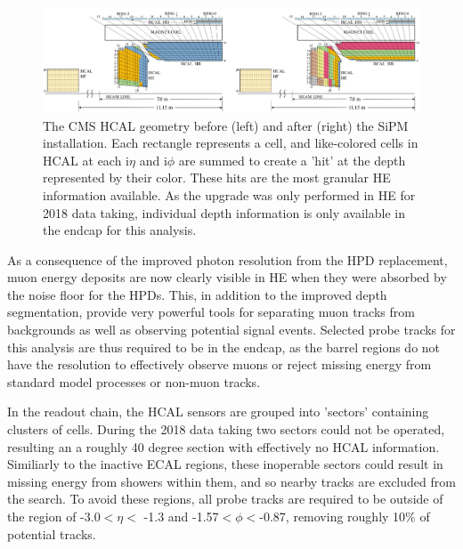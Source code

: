 \begin{figure}[!htpb]
	   \centering
	      \includegraphics[width=\textwidth]{figures/HE_upgrade.jpg}
		 \caption[The 2018 HE upgrade]{The CMS HCAL geometry before (left) and after (right) the SiPM installation. Each rectangle represents a cell, and like-colored cells in HCAL at each i$\eta$ and i$\phi$ are summed to create a 'hit' at the depth represented by their color. These hits are the most granular HE information available. As the upgrade was only performed in HE for 2018 data taking, individual depth information is only available in the endcap for this analysis.}
	    \label{fig:HElayout}
\end{figure}

As a consequence of the improved photon resolution from the HPD replacement, muon energy deposits are now clearly visible in HE when they were absorbed by the noise floor for the HPDs. 
This, in addition to the improved depth segmentation, provide very powerful tools for separating muon tracks from backgrounds as well as observing potential signal events.
Selected probe tracks for this analysis are thus required to be in the endcap, as the barrel regions do not have the resolution to effectively observe muons or reject missing energy from standard model processes or non-muon tracks.

In the readout chain, the HCAL sensors are grouped into 'sectors' containing clusters of cells. During the 2018 data taking two sectors could not be operated, resulting an a roughly 40 degree section with effectively no HCAL information. Similiarly to the inactive ECAL regions, these inoperable sectors could result in missing energy from showers within them, and so nearby tracks are excluded from the search. 
To avoid these regions, all probe tracks are required to be outside of the region of -3.0$<\eta<$ -1.3 and -1.57$<\phi<$-0.87, removing roughly 10$\%$ of potential tracks.

